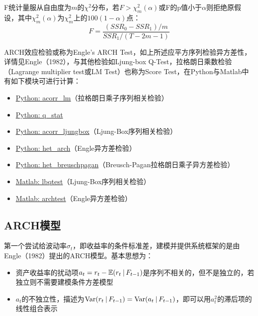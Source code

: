 \documentclass[11pt]{article}
\begin{document}
F统计量服从自由度为$m$的$\chi^2$分布，若$F>\chi_m^2(\alpha)$或F的p值小于$\alpha$则拒绝原假设，其中$\chi_m^2(\alpha)$为$\chi_m^2$上的$100(1-\alpha)$点：
\begin{equation*}
    F = \frac{(SSR_0-SSR_1)/m}{SSR_1/(T-2m-1)}
\end{equation*}

\begin{remark}
    ARCH效应检验或称为Engle's ARCH Test，如上所述应平方序列检验异方差性，详情见Engle（1982），与其他检验如Ljung-box Q-Test，拉格朗日乘数检验（Lagrange multiplier test或LM Test）也称为Score Test，在Python与Matlab中有如下模块可进行计算：
    \begin{itemize}
        \item \href{https://www.statsmodels.org/stable/generated/statsmodels.stats.diagnostic.acorr\_lm.html}{Python: acorr\_lm}（拉格朗日乘子序列相关检验）
        \item \href{https://www.statsmodels.org/stable/generated/statsmodels.tsa.stattools.q_stat.html#statsmodels.tsa.stattools.q_stat}{Python: q\_stat}
        \item \href{https://www.statsmodels.org/stable/generated/statsmodels.stats.diagnostic.acorr\_ljungbox.html}{Python: acorr\_ljungbox}（Ljung-Box序列相关检验）
        \item \href{https://www.statsmodels.org/stable/generated/statsmodels.stats.diagnostic.het\_arch.html}{Python: het\_arch}（Engle异方差检验）
        \item \href{https://www.statsmodels.org/stable/generated/statsmodels.stats.diagnostic.het\_breuschpagan.html}{Python: het\_breuschpagan}（Breusch-Pagan拉格朗日乘子异方差检验）
        \item \href{https://www.mathworks.com/help/econ/lbqtest.html}{Matlab: lbqtest}（Ljung-Box序列相关检验）
        \item \href{https://www.mathworks.com/help/econ/archtest.html}{Matlab: archtest}（Engle异方差检验）
    \end{itemize}
\end{remark}

\subsection{ARCH模型}

第一个尝试给波动率$\sigma_t$，即收益率的条件标准差，建模并提供系统框架的是由Engle（1982）提出的ARCH模型。基本思想为：
\begin{itemize}
    \item 资产收益率的扰动项$a_t = r_t - \mathbb{E}(r_t \:\vert\, F_{t-1})$是序列不相关的，但不是独立的，若独立则不需要建模条件方差模型
    \item $a_t$的不独立性，描述为$\operatorname{Var}(r_t \:\vert\, F_{t-1}) = \operatorname{Var}(a_t \:\vert\, F_{t-1})$，即可以用$a_{t}^{2}$的滞后项的线性组合表示
\end{itemize}
\end{document}
